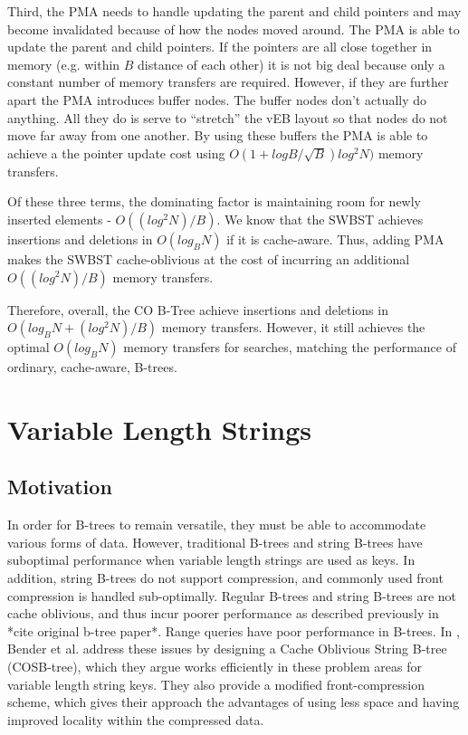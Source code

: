 \documentclass{style}
\begin{document}
Third, the PMA needs to handle updating the parent and child pointers and may
become invalidated because of how the nodes moved around. The PMA is able to
update the parent and child pointers. If the pointers are all close together
in memory (e.g. within $B$ distance of each other) it is not big deal because
only a constant number of memory transfers are required. However, if they are
further apart the PMA introduces buffer nodes. The buffer nodes don't actually
do anything. All they do is serve to ``stretch'' the vEB layout so that nodes
do not move far away from one another. By using these buffers the PMA is able
to achieve a the pointer update cost using $O(1+ logB / \sqrt{B}) log^2 N)$
memory transfers.

Of these three terms, the dominating factor is maintaining room for newly
inserted elements - $O((log^2N)/B)$. We know that the SWBST achieves insertions and
deletions in $O(log_B N)$ if it is cache-aware. Thus, adding PMA makes
the SWBST cache-oblivious at the cost of incurring an additional $O((log^2N)/B)$ memory
transfers.

Therefore, overall, the CO B-Tree achieve insertions and deletions in $O(log_B N +
(log^2N)/B)$ memory transfers. However, it still achieves the optimal
$O(log_B N)$ memory transfers for searches, matching the performance of
ordinary, cache-aware, B-trees.

\section{Variable Length Strings}

\subsection{Motivation}
In order for B-trees to remain versatile, they must be able to accommodate various forms of data. However, traditional B-trees and string B-trees have suboptimal performance when variable length strings are used as keys. In addition, string B-trees do not support compression, and commonly used front compression is handled sub-optimally. Regular B-trees and string B-trees are not cache oblivious, and thus incur poorer performance as described previously in *cite original b-tree paper*. Range queries have poor performance in B-trees. In \cite{BenderFaKu06}, Bender et al. address these issues by designing a Cache Oblivious String B-tree (COSB-tree), which they argue works efficiently in these problem areas for variable length string keys. They also provide a modified front-compression scheme, which gives their approach the advantages of using less space and having improved locality within the compressed data.
\end{document}
